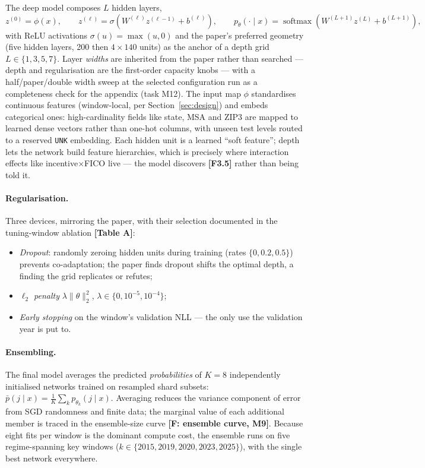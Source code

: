\documentclass[11pt,a4paper]{article}
\newcommand{\code}[1]{\texttt{#1}}
\newcommand{\artifact}[1]{\textbf{[#1]}}
\begin{document}
The deep model composes $L$ hidden layers,
\begin{equation}
\label{eq:mlp}
z^{(0)} = \phi(x), \qquad
z^{(\ell)} = \sigma\!\left(W^{(\ell)} z^{(\ell-1)} + b^{(\ell)}\right), \qquad
p_\theta(\cdot \mid x) = \operatorname{softmax}\!\left(W^{(L+1)} z^{(L)} + b^{(L+1)}\right),
\end{equation}
with ReLU activations $\sigma(u)=\max(u,0)$ and the paper's preferred geometry (five hidden layers, 200 then $4\times140$ units) as the anchor of a depth grid $L\in\{1,3,5,7\}$. Layer \emph{widths} are inherited from the paper rather than searched --- depth and regularisation are the first-order capacity knobs --- with a half/paper/double width sweep at the selected configuration run as a completeness check for the appendix (task M12). The input map $\phi$ standardises continuous features (window-local, per Section~\ref{sec:design}) and embeds categorical ones: high-cardinality fields like state, MSA and ZIP3 are mapped to learned dense vectors rather than one-hot columns, with unseen test levels routed to a reserved \code{UNK} embedding. Each hidden unit is a learned ``soft feature''; depth lets the network build feature hierarchies, which is precisely where interaction effects like incentive$\times$FICO live --- the model discovers \artifact{F3.5} rather than being told it.

\paragraph{Regularisation.} Three devices, mirroring the paper, with their selection documented in the tuning-window ablation \artifact{Table A}:
\begin{itemize}[itemsep=1pt]
\item \emph{Dropout}: randomly zeroing hidden units during training (rates $\{0, 0.2, 0.5\}$) prevents co-adaptation; the paper finds dropout shifts the optimal depth, a finding the grid replicates or refutes;
\item \emph{$\ell_2$ penalty} $\lambda\|\theta\|_2^2$, $\lambda\in\{0, 10^{-5}, 10^{-4}\}$;
\item \emph{Early stopping} on the window's validation NLL --- the only use the validation year is put to.
\end{itemize}

\paragraph{Ensembling.} The final model averages the predicted \emph{probabilities} of $K{=}8$ independently initialised networks trained on resampled shard subsets:
$\bar p(j\mid x) = \tfrac1K \sum_k p_{\theta_k}(j \mid x)$.
Averaging reduces the variance component of error from SGD randomness and finite data; the marginal value of each additional member is traced in the ensemble-size curve \artifact{F: ensemble curve, M9}. Because eight fits per window is the dominant compute cost, the ensemble runs on five regime-spanning key windows ($k\in\{2015, 2019, 2020, 2023, 2025\}$), with the single best network everywhere.
\end{document}
